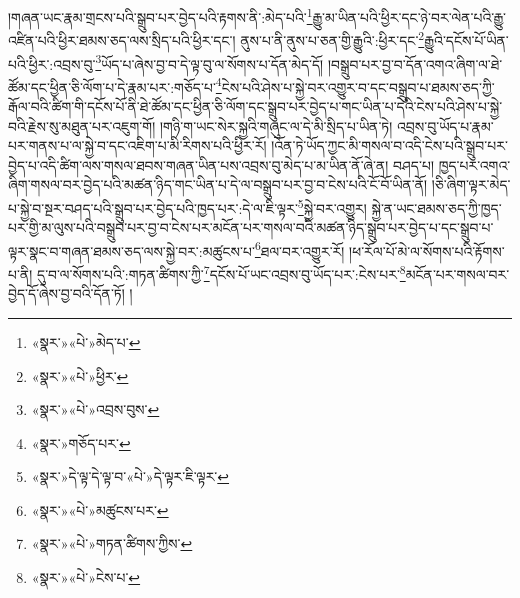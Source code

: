 །གཞན་ཡང་རྣམ་གྲངས་པའི་སྒྲུབ་པར་བྱེད་པའི་རྟགས་ནི་:མེད་པའི་\footnote{«སྣར་»«པེ་»མེད་པ་}རྒྱུ་མ་ཡིན་པའི་ཕྱིར་དང་ཉེ་བར་ལེན་པའི་རྒྱུ་འཛིན་པའི་ཕྱིར་ཐམས་ཅད་ལས་སྲིད་པའི་ཕྱིར་དང་། ནུས་པ་ནི་ནུས་པ་ཅན་གྱི་རྒྱུའི་:ཕྱིར་དང་\footnote{«སྣར་»«པེ་»ཕྱིར་}རྒྱུའི་དངོས་པོ་ཡིན་པའི་ཕྱིར་:འབྲས་བུ་\footnote{«སྣར་»«པེ་»འབྲས་བུས་}ཡོད་པ་ཞེས་བྱ་བ་དེ་ལྟ་བུ་ལ་སོགས་པ་དོན་མེད་དོ། །བསྒྲུབ་པར་བྱ་བ་དོན་འགའ་ཞིག་ལ་ཐེ་ཚོམ་དང་ཕྱིན་ཅི་ལོག་པ་དེ་རྣམ་པར་:གཅོད་པ་\footnote{«སྣར་»གཅོད་པར་}ངེས་པའི་ཤེས་པ་སྐྱེ་བར་འགྱུར་བ་དང་བསྒྲུབ་པ་ཐམས་ཅད་ཀྱི་རྒོལ་བའི་ཚིག་གི་དངོས་པོ་ནི་ཐེ་ཚོམ་དང་ཕྱིན་ཅི་ལོག་དང་སྒྲུབ་པར་བྱེད་པ་གང་ཡིན་པ་དེའི་ངེས་པའི་ཤེས་པ་སྐྱེ་བའི་རྗེས་སུ་མཐུན་པར་འཇུག་གོ། །གཉི་ག་ཡང་སེར་སྐྱའི་གཞུང་ལ་དེ་མི་སྲིད་པ་ཡིན་ཏེ། འབྲས་བུ་ཡོད་པ་རྣམ་པར་གནས་པ་ལ་སྐྱེ་བ་དང་འཇིག་པ་མི་རིགས་པའི་ཕྱིར་རོ། །འོན་ཏེ་ཡོད་ཀྱང་མི་གསལ་བ་འདི་ངེས་པའི་སྒྲུབ་པར་བྱེད་པ་འདི་ཚིག་ལས་གསལ་ཐབས་གཞན་ཡིན་པས་འབྲས་བུ་མེད་པ་མ་ཡིན་ནོ་ཞེ་ན། བཤད་པ། ཁྱད་པར་འགའ་ཞིག་གསལ་བར་བྱེད་པའི་མཚན་ཉིད་གང་ཡིན་པ་དེ་ལ་བསྒྲུབ་པར་བྱ་བ་ངེས་པའི་ངོ་བོ་ཡིན་ནོ། །ཅི་ཞིག་ལྟར་མེད་པ་སྐྱེ་བ་སྔར་བཤད་པའི་སྒྲུབ་པར་བྱེད་པའི་ཁྱད་པར་:དེ་ལ་ཇི་ལྟར་\footnote{«སྣར་»དེ་ལྟ་དེ་ལྟ་བ་«པེ་»དེ་ལྟར་ཇི་ལྟར་}སྐྱེ་བར་འགྱུར། སྐྱེ་ན་ཡང་ཐམས་ཅད་ཀྱི་ཁྱད་པར་གྱི་མ་ལུས་པའི་བསྒྲུབ་པར་བྱ་བ་ངེས་པར་མངོན་པར་གསལ་བའི་མཚན་ཉིད་སྒྲུབ་པར་བྱེད་པ་དང་སྒྲུབ་པ་ལྟར་སྣང་བ་གཞན་ཐམས་ཅད་ལས་སྐྱེ་བར་:མཚུངས་པ་\footnote{«སྣར་»«པེ་»མཚུངས་པར་}ཐལ་བར་འགྱུར་རོ། །ཕ་རོལ་པོ་མེ་ལ་སོགས་པའི་རྟོགས་པ་ནི། དུ་བ་ལ་སོགས་པའི་:གཏན་ཚིགས་ཀྱི་\footnote{«སྣར་»«པེ་»གཏན་ཚིགས་ཀྱིས་}དངོས་པོ་ཡང་འབྲས་བུ་ཡོད་པར་:ངེས་པར་\footnote{«སྣར་»«པེ་»ངེས་པ་}མངོན་པར་གསལ་བར་བྱེད་དོ་ཞེས་བྱ་བའི་དོན་ཏོ། །
